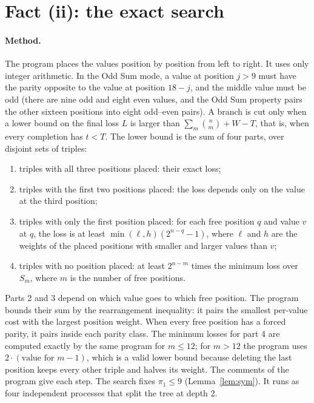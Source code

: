\documentclass[11pt]{article}
\theoremstyle{remark}
\begin{document}
\section{Fact (ii): the exact search}\label{sec:search}

\paragraph{Method.}
The program  places the values position by position from left to right. It uses only integer arithmetic. In the Odd Sum mode, a value at position $j > 9$ must have the parity opposite to the value at position $18 - j$, and the middle value must be odd (there are nine odd and eight even values, and the Odd Sum property pairs the other sixteen positions into eight odd--even pairs). A branch is cut only when a lower bound on the final loss $L$ is larger than $\sum_m \binom{n}{m} + W - T$, that is, when every completion has $t < T$. The lower bound is the sum of four parts, over disjoint sets of triples:
\begin{enumerate}
\item triples with all three positions placed: their exact loss;
\item triples with the first two positions placed: the loss depends only on the value at the third position;
\item triples with only the first position placed: for each free position $q$ and value $v$ at $q$, the loss is at least $\min(\ell, h)(2^{n-q} - 1)$, where $\ell$ and $h$ are the weights of the placed positions with smaller and larger values than $v$;
\item triples with no position placed: at least $2^{n-m}$ times the minimum loss over $S_m$, where $m$ is the number of free positions.
\end{enumerate}
Parts 2 and 3 depend on which value goes to which free position. The program bounds their sum by the rearrangement inequality: it pairs the smallest per-value cost with the largest position weight. When every free position has a forced parity, it pairs inside each parity class. The minimum losses for part 4 are computed exactly by the same program for $m \le 12$; for $m > 12$ the program uses $2 \cdot (\text{value for } m - 1)$, which is a valid lower bound because deleting the last position keeps every other triple and halves its weight. The comments of the program give each step. The search fixes $\pi_1 \le 9$ (Lemma~\ref{lem:sym}). It runs as four independent processes that split the tree at depth 2.
\end{document}

